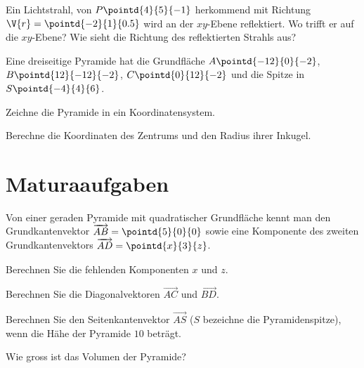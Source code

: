 \documentclass[%
11pt,%
twoside,%
titlepage,%
german,%
headsepline%
]{scrartcl}
\begin{document}
\begin{ueb}[Reflexion]
Ein Lichtstrahl, von $P\pointd{4}{5}{-1}$ herkommend mit Richtung $\V{r}=\pointd{-2}{1}{0.5}$ wird an der $xy$-Ebene reflektiert. Wo trifft er auf die $xy$-Ebene? Wie sieht die Richtung des reflektierten Strahls aus?
\end{ueb}

\begin{ueb}[Pyramide]
Eine
dreiseitige Pyramide hat die Grundfläche $A\pointd{-12}{0}{-2}$, $B\pointd{12}{-12}{-2}$, $C\pointd{0}{12}{-2}$ und die Spitze in $S\pointd{-4}{4}{6}$.
\begin{enumeratea}
\item Zeichne die Pyramide in ein Koordinatensystem.
\item Berechne die Koordinaten des Zentrums und den Radius ihrer Inkugel.
\end{enumeratea}
\end{ueb}

\clearpage

\appendix

\section{Maturaaufgaben}
\begin{ueb}
Von einer geraden Pyramide mit quadratischer Grundfläche kennt man den Grundkantenvektor $\overrightarrow{AB}=\pointd{5}{0}{0}$ sowie eine Komponente des zweiten Grundkantenvektors $\overrightarrow{AD}=\pointd{x}{3}{z}$.
\begin{enumeratea}
\item Berechnen Sie die fehlenden Komponenten $x$ und $z$.
\item Berechnen Sie die Diagonalvektoren $\overrightarrow{AC}$ und $\overrightarrow{BD}$.
\item Berechnen Sie den Seitenkantenvektor $\overrightarrow{AS}$ ($S$ bezeichne die Pyramidenspitze), wenn die Hähe der Pyramide $10$ beträgt.
\item Wie gross ist das Volumen der Pyramide?
\end{enumeratea}
\end{ueb}
\end{document}
